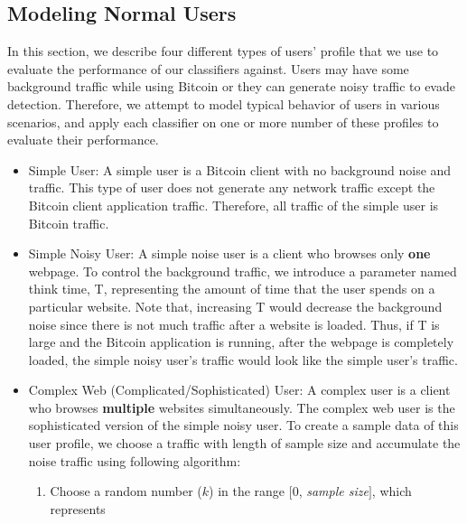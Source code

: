 \subsection{Modeling Normal Users}\label{simpleuser}

In this section, we describe four different types of users' profile that we use to evaluate the performance of our \bc classifiers against. Users may have some background traffic while using Bitcoin or they can generate noisy traffic to evade detection. Therefore, we attempt to model typical behavior of users in various scenarios, and apply each classifier on one or more number of these profiles to evaluate their performance.

\begin{itemize}
    \item Simple User: A simple user is a Bitcoin client with no background noise and traffic. This type of user does not generate any network traffic except the Bitcoin client application traffic. Therefore, all traffic of the simple user is Bitcoin traffic. 
    \item Simple Noisy User: A simple noise user is a \bc client who browses only \textbf{one} webpage.%
    To control the background traffic, we introduce a parameter named think time, T, representing the amount of time that the user spends on a particular website. Note that, increasing T would decrease the background noise since there is not much traffic after a website is loaded. Thus, if T is large and the Bitcoin application is running, after the webpage is completely loaded, the simple noisy user's traffic would look like the simple user's traffic.
    \item Complex Web (Complicated/Sophisticated) User: A complex user is a \bc client who browses \textbf{multiple} websites simultaneously. %
    The complex web user is the sophisticated version of the simple noisy user. To create a sample data of this user profile, we choose a \bc traffic with length of sample size and accumulate the noise traffic using following algorithm: 
\begin{enumerate}
 \item Choose a random number ($k$) in the range $[0$, \textit{sample size}$]$, which represents

\end{enumerate}
\end{itemize}
